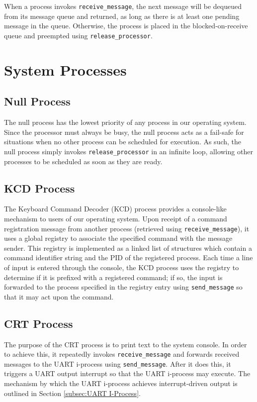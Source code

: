 \documentclass[12pt]{report}
\begin{document}
When a process invokes \texttt{receive_message}, the next message will be dequeued from its message queue and returned, as long as there is at least one pending message in the queue. Otherwise, the process is placed in the blocked-on-receive queue and preempted using \texttt{release_processor}.

\section{System Processes}

\subsection{Null Process}

The null process has the lowest priority of any process in our operating system. Since the processor must always be busy, the null process acts as a fail­-safe for situations when no other process can be scheduled for execution. As such, the null process simply invokes \texttt{release_processor} in an infinite loop, allowing other processes to be scheduled as soon as they are ready.

\subsection{KCD Process}

The Keyboard Command Decoder (KCD) process provides a console-like mechanism to users of our operating system. Upon receipt of a command registration message from another process (retrieved using \texttt{receive_message}), it uses a global registry to associate the specified command with the message sender. This registry is implemented as a linked list of structures which contain a command identifier string and the PID of the registered process. Each time a line of input is entered through the console, the KCD process uses the registry to determine if it is prefixed with a registered command; if so, the input is forwarded to the process specified in the registry entry using \texttt{send_message} so that it may act upon the command.

\subsection{CRT Process}

The purpose of the CRT process is to print text to the system console. In order to achieve this, it repeatedly invokes \texttt{receive_message} and forwards received messages to the UART i-process using \texttt{send_message}. After it does this, it triggers a UART output interrupt so that the UART i-process may execute. The mechanism by which the UART i-process achieves interrupt-driven output is outlined in Section \ref{subsec:UART I-Process}.
\end{document}
